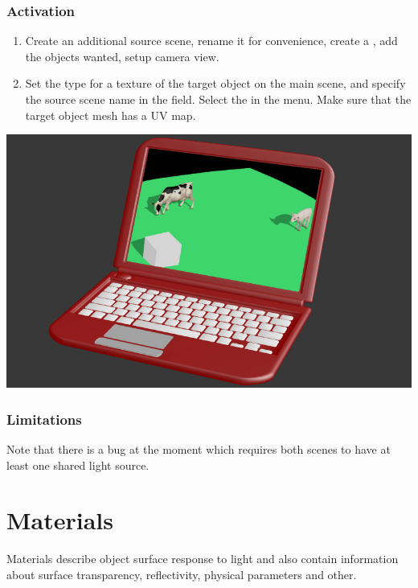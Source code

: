 \documentclass[a4paper,12pt,oneside]{sphinxmanual}
\begin{document}
\subsection{Activation}
\label{textures:id24}\begin{enumerate}
\item {} 
Create an additional source scene, rename it for convenience, create a , add the objects wanted, setup camera view.

\item {} 
Set the  type for a texture of the target object on the main scene, and specify the source scene name in the  field. Select the  in the  menu. Make sure that the target object mesh has a UV map.

\end{enumerate}

{\hfill\includegraphics[width=1.000\linewidth]{render_to_texture.jpg}\hfill}


\subsection{Limitations}
\label{textures:id25}
Note that there is a bug at the moment which requires both scenes to have at least one shared light source.
\label{materials:materials}

\chapter{Materials}
\label{materials:index-0}\label{materials::doc}\label{materials:id1}
Materials describe object surface response to light and also contain information about surface transparency, reflectivity, physical parameters and other.
\end{document}

